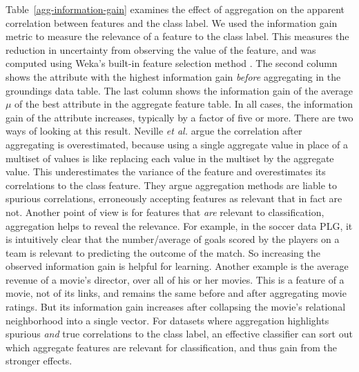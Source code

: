 \documentclass[conference]{IEEEtran}
\begin{document}
Table~\ref{agg-information-gain} examines the effect of aggregation on the apparent correlation between features and the class label. We used the information gain metric to measure the relevance of a feature to the class label. This measures the reduction in uncertainty from observing the value of the feature, %
and was computed using Weka's built-in feature selection method \cite{Hall2009}. The second column shows the attribute with the highest information gain {\em before} aggregating in the groundings data table. The last column  shows the information gain of the average $\mu$ of the best attribute in the aggregate feature table. In all cases, the information gain of the attribute increases, typically by a factor of five or more. There are two ways of looking at this result. Neville {\em et al.} \cite{Jensen2003,jensen-auto,Neville2003} argue the correlation after aggregating is overestimated, because using a single aggregate value in place of a multiset of values is like replacing each value in the multiset by the aggregate value. This underestimates the variance of the feature and overestimates its correlations to the class feature. They argue aggregation methods are liable to spurious correlations, erroneously accepting features as relevant that in fact are not. Another point of view is for features that {\em are} relevant to classification, aggregation helps to reveal the relevance. For example, in the soccer data PLG, it is intuitively clear that the number/average of goals scored by the players on a team is relevant to predicting the outcome of the match. So increasing the observed information gain is helpful for learning. Another example is the average revenue of a movie's director, over all of his or her movies. This is a feature of a movie, not of its links, and remains the same before and after aggregating movie ratings. But its information gain increases after collapsing the movie's relational neighborhood into a single vector. For datasets where aggregation highlights spurious {\em and} true correlations to the class label, an effective classifier can sort out which aggregate features are relevant for classification, and thus gain from the stronger effects. %
\end{document}
